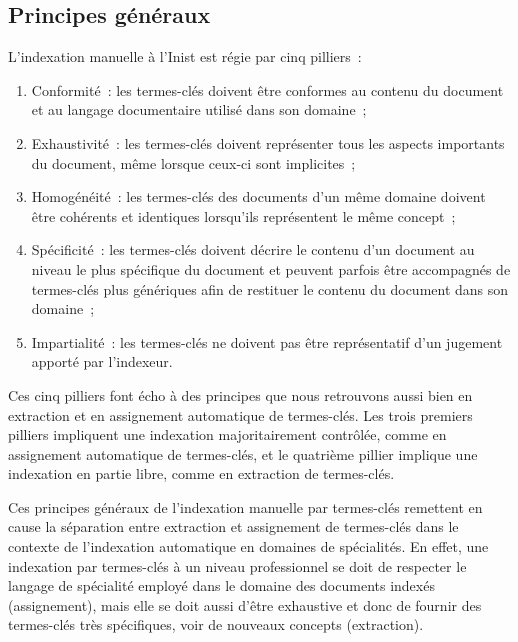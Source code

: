     \subsection{Principes généraux}
    \label{subsec:main-domain_specific_keyphrase_annotation-manual_keyphrase_annotation-principles}
      L'indexation manuelle à l'Inist est régie par cinq pilliers~:
      \begin{enumerate}
        \item{Conformité~: les termes-clés doivent être conformes au contenu du
              document et au langage documentaire utilisé dans son domaine~;}
        \item{Exhaustivité~: les termes-clés doivent représenter tous les
              aspects importants du document, même lorsque ceux-ci sont
              implicites~;}
        \item{Homogénéité~: les termes-clés des documents d'un même domaine
              doivent être cohérents et identiques lorsqu'ils représentent le
              même concept~;}
        \item{Spécificité~: les termes-clés doivent décrire le contenu d'un
              document au niveau le plus spécifique du document et peuvent
              parfois être accompagnés de termes-clés plus génériques afin de
              restituer le contenu du document dans son domaine~;}
        \item{Impartialité~: les termes-clés ne doivent pas être représentatif
              d'un jugement apporté par l'indexeur.}
      \end{enumerate}
      Ces cinq pilliers font écho à des principes que nous retrouvons aussi bien
      en extraction et en assignement automatique de termes-clés. Les trois
      premiers pilliers impliquent une indexation majoritairement contrôlée,
      comme en assignement automatique de termes-clés, et le quatrième pillier
      implique une indexation en partie libre, comme en extraction de
      termes-clés.

      Ces principes généraux de l'indexation manuelle par termes-clés remettent
      en cause la séparation entre extraction et assignement de termes-clés dans
      le contexte de l'indexation automatique en domaines de spécialités. En
      effet, une indexation par termes-clés à un niveau professionnel se doit de
      respecter le langage de spécialité employé dans le domaine des documents
      indexés (assignement), mais elle se doit aussi d'être exhaustive et donc
      de fournir des termes-clés très spécifiques, voir de nouveaux
      concepts (extraction).

